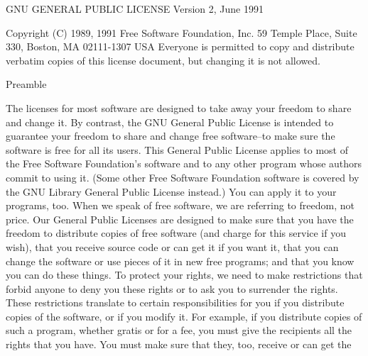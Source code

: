 
\begin{DoxyCodeInclude}
                    GNU GENERAL PUBLIC LICENSE
                       Version 2, June 1991

 Copyright (C) 1989, 1991 Free Software Foundation, Inc.
     59 Temple Place, Suite 330, Boston, MA  02111-1307  USA
 Everyone is permitted to copy and distribute verbatim copies
 of \textcolor{keyword}{this} license document, but changing it is not allowed.

                            Preamble

  The licenses \textcolor{keywordflow}{for} most software are designed to take away your
freedom to share and change it.  By contrast, the GNU General Public
License is intended to guarantee your freedom to share and change free
software--to make sure the software is free \textcolor{keywordflow}{for} all its users.  This
General Public License applies to most of the Free Software
Foundation\textcolor{stringliteral}{'s software and to any other program whose authors commit to}
\textcolor{stringliteral}{using it.  (Some other Free Software Foundation software is covered by}
\textcolor{stringliteral}{the GNU Library General Public License instead.)  You can apply it to}
\textcolor{stringliteral}{your programs, too.}
\textcolor{stringliteral}{}
\textcolor{stringliteral}{  When we speak of free software, we are referring to freedom, not}
\textcolor{stringliteral}{price.  Our General Public Licenses are designed to make sure that you}
\textcolor{stringliteral}{have the freedom to distribute copies of free software (and charge for}
\textcolor{stringliteral}{this service if you wish), that you receive source code or can get it}
\textcolor{stringliteral}{if you want it, that you can change the software or use pieces of it}
\textcolor{stringliteral}{in new free programs; and that you know you can do these things.}
\textcolor{stringliteral}{}
\textcolor{stringliteral}{  To protect your rights, we need to make restrictions that forbid}
\textcolor{stringliteral}{anyone to deny you these rights or to ask you to surrender the rights.}
\textcolor{stringliteral}{These restrictions translate to certain responsibilities for you if you}
\textcolor{stringliteral}{distribute copies of the software, or if you modify it.}
\textcolor{stringliteral}{}
\textcolor{stringliteral}{  For example, if you distribute copies of such a program, whether}
\textcolor{stringliteral}{gratis or for a fee, you must give the recipients all the rights that}
\textcolor{stringliteral}{you have.  You must make sure that they, too, receive or can get the}

\end{DoxyCodeInclude}
